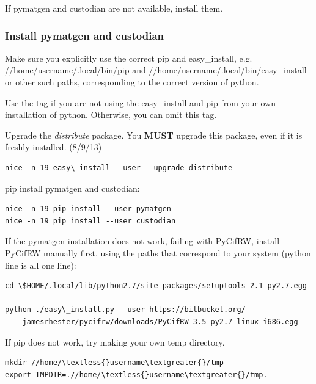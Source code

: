\documentclass[letterpaper,10pt,english]{sphinxmanual}
\begin{document}
If pymatgen and custodian are not available, install them.


\subsubsection{Install pymatgen and custodian}
\label{1_0_installation:install-pymatgen-and-custodian}
Make sure you explicitly use the correct pip and easy\_install, e.g. //home/username/.local/bin/pip and //home/username/.local/bin/easy\_install or other such paths, corresponding to the correct version of python.

Use the  tag if you are not using the easy\_install and pip from your own installation of python. Otherwise, you can omit this tag.

Upgrade the \emph{distribute} package. You \textbf{MUST} upgrade this package, even if it is freshly installed. (8/9/13)

\begin{Verbatim}[commandchars=\\\{\}]
nice -n 19 easy\_install --user --upgrade distribute
\end{Verbatim}

pip install pymatgen and custodian:

\begin{Verbatim}[commandchars=\\\{\}]
nice -n 19 pip install --user pymatgen
nice -n 19 pip install --user custodian
\end{Verbatim}

If the pymatgen installation does not work, failing with PyCifRW, install PyCifRW manually first, using the paths that correspond to your system (python line is all one line):

\begin{Verbatim}[commandchars=\\\{\}]
cd \$HOME/.local/lib/python2.7/site-packages/setuptools-2.1-py2.7.egg

python ./easy\_install.py --user https://bitbucket.org/
    jamesrhester/pycifrw/downloads/PyCifRW-3.5-py2.7-linux-i686.egg
\end{Verbatim}

If pip does not work, try making your own temp directory.

\begin{Verbatim}[commandchars=\\\{\}]
mkdir //home/\textless{}username\textgreater{}/tmp
export TMPDIR=.//home/\textless{}username\textgreater{}/tmp.
\end{Verbatim}
\end{document}
